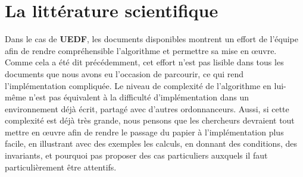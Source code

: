 \section{La littérature scientifique}

	Dans le cas de \textbf{UEDF}, les documents disponibles montrent un effort de l'équipe afin de rendre compréhensible 
	l'algorithme et permettre sa mise en œuvre. Comme cela a été dit précédemment, cet effort n'est pas lisible dans tous les 
	documents que nous avons eu l'occasion de parcourir, ce qui rend l'implémentation compliquée. Le niveau de complexité 
	de l'algorithme en lui-même n'est pas équivalent à la difficulté d'implémentation dans un environnement 
	déjà écrit, partagé avec d'autres ordonnanceurs. Aussi, si cette complexité est déjà très grande, nous pensons que les 
	chercheurs devraient tout mettre en œuvre afin de rendre le passage du papier à l'implémentation plus facile, en illustrant 
	avec des exemples les calculs, en donnant des conditions, des invariants, et pourquoi pas proposer des cas particuliers 
	auxquels il faut particulièrement être attentifs. 
	

